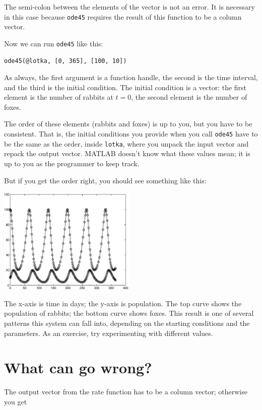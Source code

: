 \documentclass{book}
\begin{document}
The semi-colon between the elements of the vector is not an error.  It
is necessary in this case because {\tt ode45} requires the result of
this function to be a column vector.

Now we can run {\tt ode45} like this:

\begin{verbatim}
ode45(@lotka, [0, 365], [100, 10])
\end{verbatim}

As always, the first argument is a function handle, the second is the
time interval, and the third is the initial condition.  The initial
condition is a vector: the first element is the number of rabbits at
$t=0$, the second element is the number of foxes.

The order of these elements (rabbits and foxes) is up to you, but
you have to be consistent.  That is, the initial conditions you
provide when you call {\tt ode45} have to be the same as the order,
inside {\tt lotka}, where you unpack the input vector and repack
the output vector.  MATLAB doesn't know what these values mean;
it is up to you as the programmer to keep track.

But if you get the order right, you should see something like this:

\beforefig \centerline{\includegraphics[height=2in]{figs/lotka.eps}}

The x-axis is time in days; the y-axis is population.  The top
curve shows the population of rabbits; the bottom curve shows
foxes.  This result is one of several patterns
this system can fall into, depending on the starting conditions
and the parameters.  As an exercise, try experimenting with
different values.


\section{What can go wrong?}

The output vector from the rate function
has to be a column vector; otherwise you get
\end{document}
